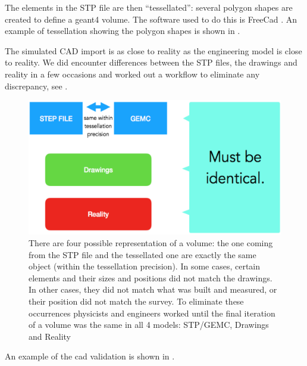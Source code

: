 The elements in the STP file are then ``tessellated'': several polygon shapes are created to define a geant4 volume.
The software used to do this is FreeCad \cite{freeCad}. An example of tessellation showing the polygon shapes
is shown in .

The simulated CAD import is as close to reality as the engineering model is close to reality.
We did encounter differences between the STP files, the drawings and reality in a few occasions and worked
out a workflow to eliminate any discrepancy, see .


\begin{figure}
	\centering
	\includegraphics[width=0.95\columnwidth,keepaspectratio]{img/cadValidation.png}
	\caption{There are four possible representation of a volume: the one coming from the STP file
             and the tessellated one are exactly the same object (within the tessellation precision).
             In some cases, certain elements and their sizes and positions did not match the drawings.
             In other cases, they did not match what was built and measured, or their position did not
             match the survey. To eliminate these occurrences physicists and engineers worked until
             the final iteration of a volume was the same in all 4 models: STP/GEMC, Drawings and Reality}
	\label{fig:cadValidation}
\end{figure}

An example of the cad validation is shown in .

